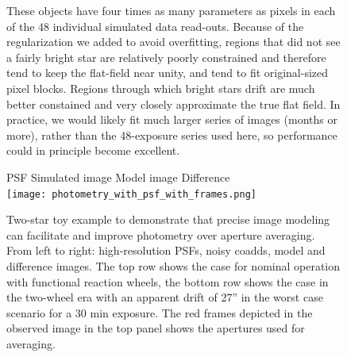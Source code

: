 \documentclass[letterpaper,12pt,whitepaper]{haastex}
\begin{document}
\begin{figure}
{  These objects have four times as many parameters as pixels in each of the 48 individual simulated data read-outs.
  Because of the regularization we added to avoid overfitting,
  regions that did not see a fairly bright star are relatively poorly constrained
  and therefore tend to keep the flat-field near unity, and tend to fit original-sized pixel blocks.
Regions through which bright stars drift are much better constained and very closely approximate the true flat field.
In practice, we would likely fit much larger series of images (months or more),
rather than the 48-exposure series used here, so performance could in principle become excellent.\label{fig:intrapixel}}
\end{figure}

\begin{figure}
\begin{center}
\footnotesize
\hspace{1mm}PSF \hspace{18mm} Simulated image \hspace{12mm} Model image
\hspace{16mm} Difference\\

\texttt{[image: photometry\_with\_psf\_with\_frames.png]}

\caption{Two-star toy example to demonstrate that precise image
  modeling can facilitate and improve photometry over aperture
  averaging. From left to right: high-resolution PSFs, noisy coadds,
  model and difference images. The top row shows the case for nominal
  operation with functional reaction wheels, the bottom row shows the
  case in the two-wheel era with an apparent drift of 27'' in the
  worst case scenario for a 30 min exposure. The red frames depicted
  in the observed image in the top panel shows the apertures used for
  averaging.}
\end{center}
\label{fig:photometry}
\end{figure}
\end{document}

